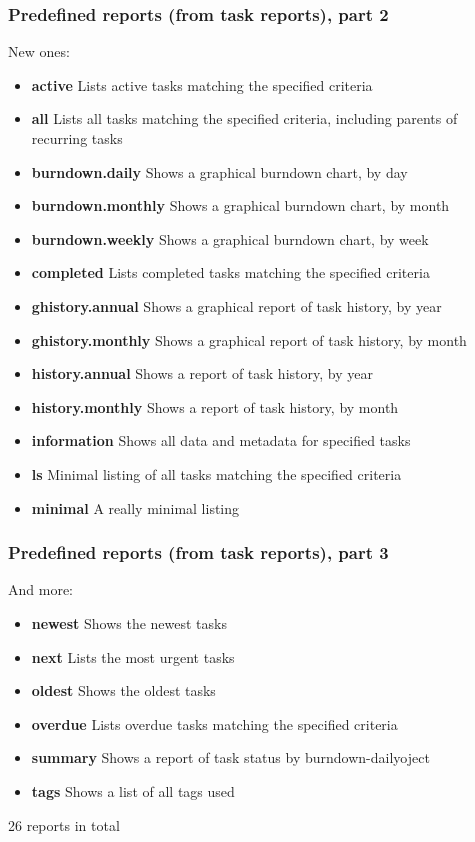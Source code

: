 \documentclass[t,handout]{beamer}
\begin{document}
\begin{frame}\frametitle{Predefined reports (from task reports), part 2}

New ones:

\begin{itemize}
\item \textbf{active}           Lists active tasks matching the specified criteria
\item \textbf{all}              Lists all tasks matching the specified criteria, including parents of recurring tasks
\item \textbf{burndown.daily}   Shows a graphical burndown chart, by day
\item \textbf{burndown.monthly} Shows a graphical burndown chart, by month
\item \textbf{burndown.weekly}  Shows a graphical burndown chart, by week
\item \textbf{completed}        Lists completed tasks matching the specified criteria
\item \textbf{ghistory.annual}  Shows a graphical report of task history, by year
\item \textbf{ghistory.monthly} Shows a graphical report of task history, by month
\item \textbf{history.annual}   Shows a report of task history, by year
\item \textbf{history.monthly}  Shows a report of task history, by month
\item \textbf{information}      Shows all data and metadata for specified tasks
\item \textbf{ls}               Minimal listing of all tasks matching the specified criteria
\item \textbf{minimal}          A really minimal listing
\end{itemize}
\end{frame}

\begin{frame}\frametitle{Predefined reports (from task reports), part 3}

And more:

\begin{itemize}
\item \textbf{newest}           Shows the newest tasks
\item \textbf{next}             Lists the most urgent tasks
\item \textbf{oldest}           Shows the oldest tasks
\item \textbf{overdue}          Lists overdue tasks matching the specified criteria
\item \textbf{summary}          Shows a report of task status by burndown-dailyoject
\item \textbf{tags}             Shows a list of all tags used
\end{itemize}

26 reports in total
\end{frame}
\end{document}
